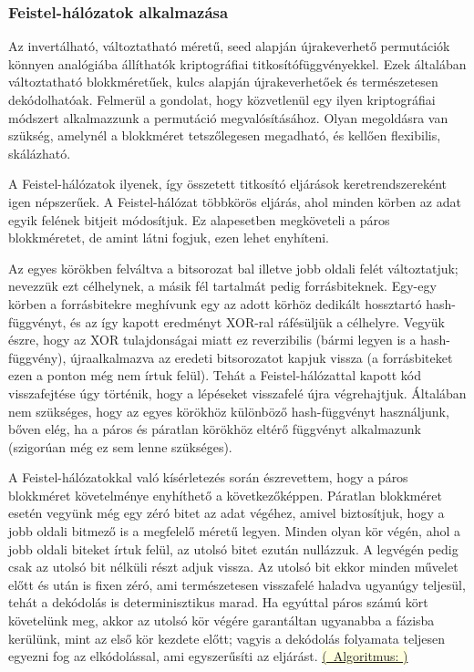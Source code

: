 \documentclass[
    parspace,
    noindent,
    nohyp,
]{elteiktdk}[2023/04/10]
\newcommand{\algorithmref}[1]{\hyperref[algorithm:#1]{\colorbox{lightyellow}{%
(\textrightarrow~Algoritmus: \nameref*{algorithm:#1})}}}
\begin{document}
\subsubsection{Feistel-hálózatok alkalmazása}

Az invertálható, változtatható méretű, seed alapján újrakeverhető permutációk könnyen analógiába állíthatók kriptográfiai titkosítófüggvényekkel.
Ezek általában változtatható blokkméretűek, kulcs alapján újrakeverhetőek és természetesen dekódolhatóak.
Felmerül a gondolat, hogy közvetlenül egy ilyen kriptográfiai módszert alkalmazzunk a permutáció megvalósításához.
Olyan megoldásra van szükség, amelynél a blokkméret tetszőlegesen megadható, és kellően flexibilis, skálázható.

A Feistel-hálózatok ilyenek, így összetett titkosító eljárások keretrendszereként igen népszerűek.
A Feistel-hálózat többkörös eljárás, ahol minden körben az adat egyik felének bitjeit módosítjuk.
Ez alapesetben megköveteli a páros blokkméretet, de amint látni fogjuk, ezen lehet enyhíteni.

Az egyes körökben felváltva a bitsorozat bal illetve jobb oldali felét változtatjuk; nevezzük ezt célhelynek, a másik fél tartalmát pedig forrásbiteknek.
Egy-egy körben a forrásbitekre meghívunk egy az adott körhöz dedikált hossztartó hash-függvényt,
és az így kapott eredményt XOR-ral ráfésüljük a célhelyre.
Vegyük észre, hogy az XOR tulajdonságai miatt ez reverzibilis (bármi legyen is a hash-függvény),
újraalkalmazva az eredeti bitsorozatot kapjuk vissza
(a forrásbiteket ezen a ponton még nem írtuk felül).
Tehát a Feistel-hálózattal kapott kód visszafejtése úgy történik, hogy a lépéseket visszafelé újra végrehajtjuk.
Általában nem szükséges, hogy az egyes körökhöz különböző hash-függvényt használjunk,
bőven elég, ha a páros és páratlan körökhöz eltérő függvényt alkalmazunk (szigorúan még ez sem lenne szükséges).

A Feistel-hálózatokkal való kísérletezés során észrevettem,
hogy a páros blokkméret követelménye enyhíthető a következőképpen.
Páratlan blokkméret esetén vegyünk még egy zéró bitet az adat végéhez,
amivel biztosítjuk, hogy a jobb oldali bitmező is a megfelelő méretű legyen.
Minden olyan kör végén, ahol a jobb oldali biteket írtuk felül, az utolsó bitet ezután nullázzuk.
A legvégén pedig csak az utolsó bit nélküli részt adjuk vissza.
Az utolsó bit ekkor minden művelet előtt és után is fixen zéró,
ami természetesen visszafelé haladva ugyanúgy teljesül, tehát a dekódolás is determinisztikus marad.
Ha egyúttal páros számú kört követelünk meg,
akkor az utolsó kör végére garantáltan ugyanabba a fázisba kerülünk, mint az első kör kezdete előtt;
vagyis a dekódolás folyamata teljesen egyezni fog az elkódolással, ami egyszerűsíti az eljárást.
\algorithmref{feistel}
\end{document}
